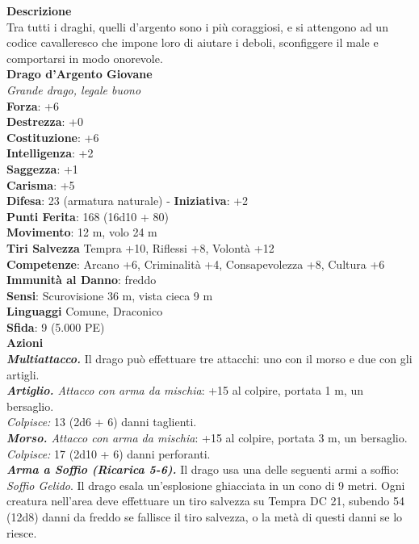 \begin{multicols}{2}
\textbf{Descrizione}\\
Tra tutti i draghi, quelli d'argento sono i più coraggiosi, e si attengono ad un codice cavalleresco che impone loro di aiutare i deboli, sconfiggere il male e comportarsi in modo onorevole.\\
\medskip\textbf{Drago d'Argento Giovane}\\
\emph{Grande drago, legale buono}\\
\textbf{Forza}: +6\\
\textbf{Destrezza}: +0\\
\textbf{Costituzione}: +6\\
\textbf{Intelligenza}: +2\\
\textbf{Saggezza}: +1\\
\textbf{Carisma}: +5\\
\textbf{Difesa}: 23 (armatura naturale) - \textbf{Iniziativa}: +2\\
\textbf{Punti Ferita}: 168 (16d10 + 80)\\
\textbf{Movimento}: 12 m, volo 24 m\\
\textbf{Tiri Salvezza} Tempra +10, Riflessi +8, Volontà +12\\
\textbf{Competenze}: Arcano +6, Criminalità +4, Consapevolezza +8, Cultura +6\\
\textbf{Immunità al Danno}: freddo\\
\textbf{Sensi}: Scurovisione 36 m, vista cieca 9 m\\
\textbf{Linguaggi} Comune, Draconico\\
\textbf{Sfida}: 9 (5.000 PE)\smallskip\\
\smallskip\textbf{Azioni}\\
\emph{\textbf{Multiattacco.}} Il drago può effettuare tre attacchi: uno con il morso e due con gli artigli.\\
\emph{\textbf{Artiglio.} Attacco con arma da mischia}: +15 al colpire, portata 1 m, un bersaglio.\\
\emph{Colpisce:} 13 (2d6 + 6) danni taglienti.\\
\emph{\textbf{Morso.} Attacco con arma da mischia}: +15 al colpire, portata 3 m, un bersaglio.\\
\emph{Colpisce:} 17 (2d10 + 6) danni perforanti.\\
\emph{\textbf{Arma a Soffio (Ricarica 5-6).}} Il drago usa una delle seguenti armi a soffio:\\
\emph{Soffio Gelido}. Il drago esala un'esplosione ghiacciata in un cono di 9 metri. Ogni creatura nell'area deve effettuare un tiro salvezza su Tempra DC  21, subendo 54 (12d8) danni da freddo se fallisce il tiro salvezza, o la metà di questi danni se lo riesce.\\

\end{multicols}
